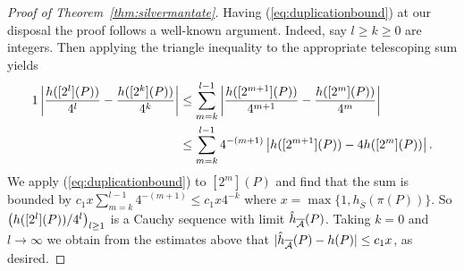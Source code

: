 \begin{proof}[Proof of Theorem~\ref{thm:silvermantate}]
  Having (\ref{eq:duplicationbound}) at our disposal the proof follows
  a well-known argument.   
  Indeed, say $l\ge k\ge 0$ are integers.
  Then applying the triangle inequality to the appropriate telescoping
  sum yields
  \begin{alignat*}1
    \left|\frac{\hcA([2^l](P))}{4^l}- \frac{\hcA([2^k](P))}{4^k}\right|
    &\le \sum_{m=k}^{l-1}
        \left|\frac{\hcA([2^{m+1}](P))}{4^{m+1}}-
        \frac{\hcA([2^m](P))}{4^m}\right|\\
        &\le \sum_{m=k}^{l-1}
        4^{-(m+1)}    \left|{\hcA([2^{m+1}](P))}- 4{\hcA([2^m](P))}\right|.
  \end{alignat*}
  We apply (\ref{eq:duplicationbound}) to $[2^m](P)$ and find that the
  sum is bounded by $c_1 x \sum_{m=k}^{l-1}4^{-(m+1)} \le c_1 x 4^{-k}$
  where $x = \max\{1,h_{\overline S}(\pi(P))\}$.
  So $\left(h([2^l](P))/4^l\right)_{l\ge 1}$ is a Cauchy sequence
  with limit
  $\hat h_{\overline{\mathcal{A}}}(P)$. 
  Taking $k=0$ and $l\rightarrow \infty$ we obtain from the estimates
  above that
  $|\hat h_{\overline{\mathcal{A}}}(P) - h(P)|\le c_1x$, as
  desired.   
\end{proof}
% 
% 

% 



